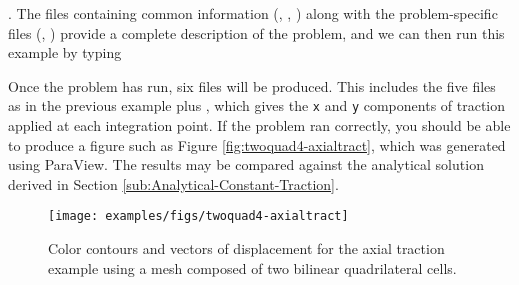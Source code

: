 .  The files containing common information
(, ,
) along with the problem-specific files
(, ) provide a
complete description of the problem, and we can then run this example
by typing
Once the problem has run, six files will be produced. This includes
the five files as in the previous example plus
, which gives the \texttt{x}
and \texttt{y} components of traction applied at each integration
point. If the problem ran correctly, you should be able to produce a
figure such as Figure \vref{fig:twoquad4-axialtract}, which was
generated using ParaView. The results may be compared against the
analytical solution derived in Section
\vref{sub:Analytical-Constant-Traction}.

\begin{figure}
  \texttt{[image: examples/figs/twoquad4-axialtract]}
  \caption{Color contours and vectors of displacement for the axial traction
    example using a mesh composed of two bilinear quadrilateral cells.}
  \label{fig:twoquad4-axialtract}
\end{figure}


